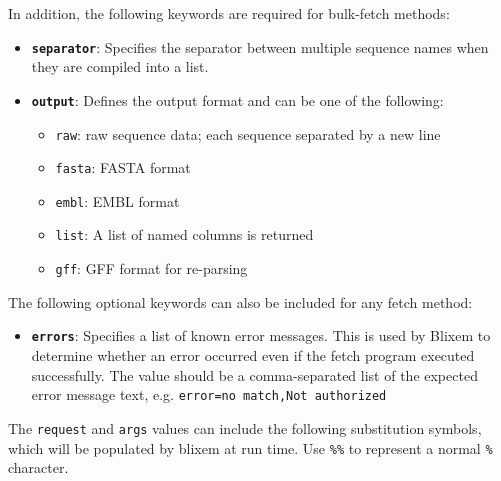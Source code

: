 \documentclass[letterpaper]{article}
\newcommand\textstyleSourceText[1]{\texttt{#1}}
\newcommand\liststyleLii{%
\renewcommand\labelitemi{{\textbullet}}
\renewcommand\labelitemii{{\textbullet}}
\renewcommand\labelitemiii{{\textbullet}}
\renewcommand\labelitemiv{{\textbullet}}
}
\begin{document}
\bigskip

{
In addition, the following keywords are required for bulk-fetch methods:
}

\liststyleLii
\begin{itemize}
\item {\texttt{\textbf{separator}}: Specifies the separator between multiple sequence names when they are compiled into a list. }
\item {
\texttt{\textbf{output}}: Defines the output format and can be one of the following: 
\begin{itemize}
\item {\texttt{raw}: raw sequence data; each sequence separated by a new line}
\item {\texttt{fasta}: FASTA format }
\item {\texttt{embl}: EMBL format }
\item {\texttt{list}: A list of named columns is returned }
\item {\texttt{gff}: GFF format for re-parsing }
\end{itemize}}
\end{itemize}

\bigskip

{
The following optional keywords can also be included for any fetch
method: }

\liststyleLii
\begin{itemize}
\item {
\texttt{\textbf{errors}}: Specifies a list of known error messages. This
is used by Blixem to determine whether an error occurred even if the
fetch program executed successfully. The value should be a
comma-separated list of the expected error message text, e.g.
\textstyleSourceText{error={\textquotedbl}no
match{\textquotedbl},{\textquotedbl}Not
authorized{\textquotedbl}}\texttt{ }}
\end{itemize}

\bigskip

{
The \textstyleSourceText{request} and
\textstyleSourceText{\texttt{args}} values can include the following
substitution symbols, which will be populated by blixem at run time.
Use \texttt{\%\%} to represent a normal \texttt{\%} character. }
\end{document}
